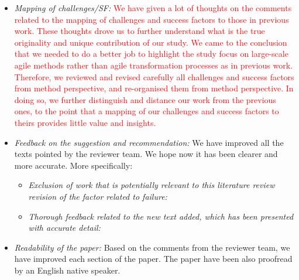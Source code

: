 \documentclass[a4paper,twoside,11pt]{reviewresponse}
\begin{document}
\begin{itemize}
	\item \textit{Mapping of challenges/SF:} \textcolor{red}{We have given a lot of thoughts on the comments related to the mapping of challenges and success factors to those in previous work. These thoughts drove us to further understand what is the true originality and unique contribution of our study. We came to the conclusion that we needed to do a better job to highlight the study focus on large-scale agile methods rather than agile transformation processes as in previous work. Therefore, we reviewed and revised carefully all challenges and success factors from method perspective, and re-organised them from method perspective. In doing so, we further distinguish and distance our work from the previous ones, to the point that a mapping of our challenges and success factors to theirs provides little value and insights.}
	\item \textit{Feedback on the suggestion and recommendation:} We have improved all the texts pointed by the reviewer team. We hope now it has been clearer and more accurate. More specifically:
		\begin{itemize}
			\item \textit{Exclusion of work that is potentially relevant to this literature review revision of the factor related to failure:}
			\item \textit{Thorough feedback related to the new text added, which has been presented with accurate detail:}
		\end{itemize}	
	\item \textit{Readability of the paper:} Based on the comments from the reviewer team, we have improved
each section of the paper. The paper have been also proofread by an English native speaker.
\end{itemize}

\clearpage
\end{document}
